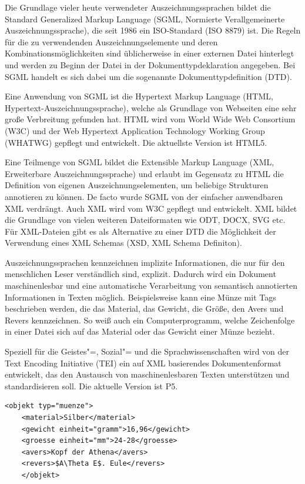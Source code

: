 Die Grundlage vieler heute verwendeter Auszeichnungssprachen bildet die Standard Generalized Markup Language (SGML, Normierte Verallgemeinerte Auszeichnungssprache), die seit 1986 ein ISO-Standard (ISO 8879) ist. Die Regeln für die zu verwendenden Auszeichnungselemente und deren Kombinationsmöglichkeiten sind üblicherweise in einer externen Datei hinterlegt und werden zu Beginn der Datei in der Dokumenttypdeklaration angegeben. Bei SGML handelt es sich dabei um die sogenannte Dokumenttypdefinition (DTD).

Eine Anwendung von SGML ist die Hypertext Markup Language (HTML, Hypertext-Auszeichnungssprache), welche als Grundlage von Webseiten eine sehr große Verbreitung gefunden hat. HTML wird vom World Wide Web Consortium (W3C) und der Web Hypertext Application Technology Working Group (WHATWG) gepflegt und entwickelt. Die aktuellste Version ist HTML5.

Eine Teilmenge von SGML bildet die Extensible Markup Language (XML, Erweiterbare Auszeichnungssprache) und erlaubt im Gegensatz zu HTML die Definition von eigenen Auszeichnungselementen, um beliebige Strukturen annotieren zu können. De facto wurde SGML von der einfacher anwendbaren XML verdrängt. Auch XML wird vom W3C gepflegt und entwickelt. XML bildet die Grundlage von vielen weiteren Dateiformaten wie ODT, DOCX, SVG etc. Für XML-Dateien gibt es als Alternative zu einer DTD die Möglichkeit der Verwendung eines XML Schemas (XSD, XML Schema Definiton).

Auszeichnungssprachen kennzeichnen implizite Informationen, die nur für den menschlichen Leser verständlich sind, explizit. Dadurch wird ein Dokument maschinenlesbar und eine automatische Verarbeitung von semantisch annotierten Informationen in Texten möglich. Beispielsweise kann eine Münze mit Tags beschrieben werden, die das Material, das Gewicht, die Größe, den Avers und Revers kennzeichnen. So weiß auch ein Computerprogramm, welche Zeichenfolge in einer Datei sich auf das Material oder das Gewicht einer Münze bezieht.

Speziell für die Geistes"=, Sozial"= und die Sprachwissenschaften wird von der Text Encoding Initiative (TEI) ein auf XML basierendes Dokumentenformat entwickelt, das den Austausch von maschinenlesbaren Texten unterstützen und standardisieren soll. Die aktuelle Version ist P5.

\newsavebox{\muenze}
\begin{lrbox}{\muenze}
	\lstset{language=XML}
	\begin{lstlisting}[mathescape]
	<objekt typ="muenze">
	<material>Silber</material>
	<gewicht einheit="gramm">16,96</gewicht>
	<groesse einheit="mm">24-28</groesse>
	<avers>Kopf der Athena</avers>
	<revers>$A\Theta E$. Eule</revers>
	</objekt>
	\end{lstlisting}
\end{lrbox}


